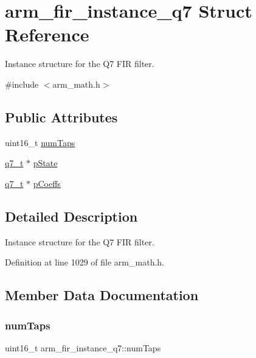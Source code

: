 \hypertarget{structarm__fir__instance__q7}{}\section{arm\+\_\+fir\+\_\+instance\+\_\+q7 Struct Reference}
\label{structarm__fir__instance__q7}


Instance structure for the Q7 F\+IR filter.  




{\ttfamily \#include $<$arm\+\_\+math.\+h$>$}

\subsection*{Public Attributes}
\begin{DoxyCompactItemize}
\item 
uint16\+\_\+t \hyperlink{structarm__fir__instance__q7_a9b50840e2c5ef5b17e1a584fb4cf0d06}{num\+Taps}
\item 
\hyperlink{arm__math_8h_ae541b6f232c305361e9b416fc9eed263}{q7\+\_\+t} $\ast$ \hyperlink{structarm__fir__instance__q7_aaddea3b9c7e16ddfd9428b7bf9f9c200}{p\+State}
\item 
\hyperlink{arm__math_8h_ae541b6f232c305361e9b416fc9eed263}{q7\+\_\+t} $\ast$ \hyperlink{structarm__fir__instance__q7_a0e45aedefc3fffad6cb315c5b6e5bd49}{p\+Coeffs}
\end{DoxyCompactItemize}


\subsection{Detailed Description}
Instance structure for the Q7 F\+IR filter. 

Definition at line 1029 of file arm\+\_\+math.\+h.



\subsection{Member Data Documentation}
\mbox{\label{structarm__fir__instance__q7_a9b50840e2c5ef5b17e1a584fb4cf0d06}} 
\subsubsection{\texorpdfstring{num\+Taps}{numTaps}}
{\footnotesize\ttfamily uint16\+\_\+t arm\+\_\+fir\+\_\+instance\+\_\+q7\+::num\+Taps}

